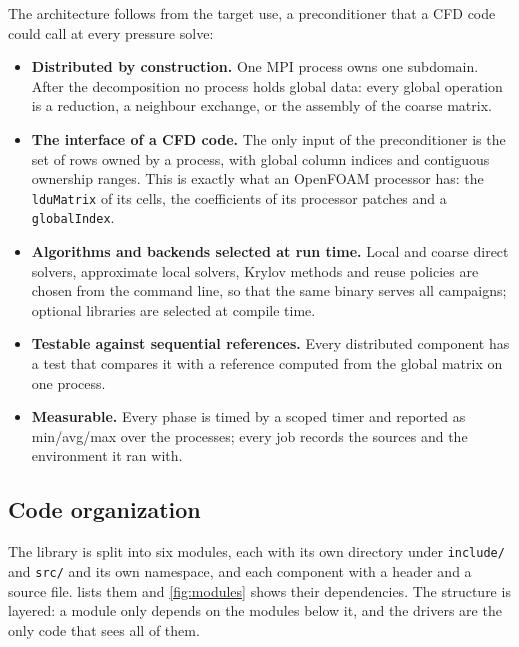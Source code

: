 \documentclass[11pt,a4paper]{article}
\begin{document}
The architecture follows from the target use, a preconditioner that a CFD code could call at every
pressure solve:
\begin{itemize}
\item \textbf{Distributed by construction.} One MPI process owns one subdomain. After the decomposition no
  process holds global data: every global operation is a reduction, a neighbour exchange, or the assembly
  of the coarse matrix.
\item \textbf{The interface of a CFD code.} The only input of the preconditioner is the set of rows owned by
  a process, with global column indices and contiguous ownership ranges. This is exactly what an OpenFOAM
  processor has: the \texttt{lduMatrix} of its cells, the coefficients of its processor patches and a
  \texttt{globalIndex}.
\item \textbf{Algorithms and backends selected at run time.} Local and coarse direct solvers, approximate
  local solvers, Krylov methods and reuse policies are chosen from the command line, so that the same binary
  serves all campaigns; optional libraries are selected at compile time.
\item \textbf{Testable against sequential references.} Every distributed component has a test that compares
  it with a reference computed from the global matrix on one process.
\item \textbf{Measurable.} Every phase is timed by a scoped timer and reported as min/avg/max over the
  processes; every job records the sources and the environment it ran with.
\end{itemize}

\subsection{Code organization}

The library is split into six modules, each with its own directory under \texttt{include/} and
\texttt{src/} and its own namespace, and each component with a header and a source file.
 lists them and \cref{fig:modules} shows their dependencies. The structure is layered:
a module only depends on the modules below it, and the drivers are the only code that sees all of them.
\end{document}
